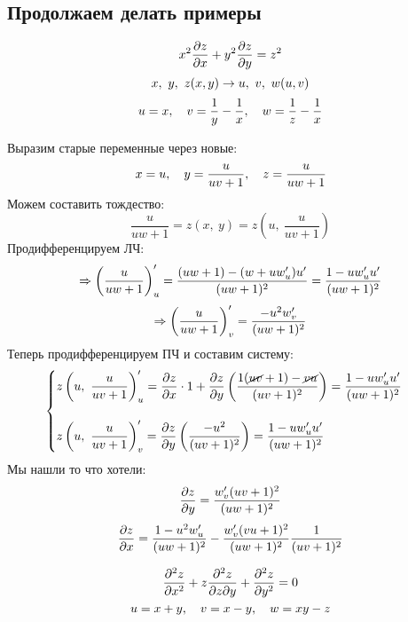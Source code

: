 \documentclass[main]{subfiles}
\begin{document}
    \subsection{Продолжаем делать примеры}

    \begin{Example}[3475]
        \[x^2 \dfrac{\partial z}{\partial x} + y^2 \dfrac{\partial z}{\partial y} = z^2\]
        \[x,\ y,\ z(x,y) \rightarrow u,\ v,\ w(u,v)\]
        \[u = x,\quad v = \dfrac{1}{y}-\dfrac{1}{x},\quad w = \dfrac{1}{z} - \dfrac{1}{x}\]
    \end{Example}

    \begin{sol}
        Выразим старые переменные через новые:
        \[x = u,\quad y = \dfrac{u}{uv + 1},\quad z = \dfrac{u}{uw + 1}\]
        Можем составить тождество:
        \[\dfrac{u}{uw + 1} = z(x,\ y) = z(u,\ \dfrac{u}{uv + 1})\]
        Продифференцируем ЛЧ:
        \[\Rightarrow \left(\dfrac{u}{uw + 1}\right)'_u = \dfrac{(uw + 1) - (w + uw'_u)u'}{(uw+1)^2} = \dfrac{1 - uw'_u u'}{(uw+1)^2}\]
        \[\Rightarrow \left(\dfrac{u}{uw + 1}\right)'_v = \dfrac{-u^2 w'_v}{(uw+1)^2}\]
        Теперь продифференцируем ПЧ и составим систему:
        \[\begin{cases}
            z \left(u,\ \dfrac{u}{uv + 1}\right)'_u = \dfrac{\partial z}{\partial x} \cdot 1 + \dfrac{\partial z}{\partial y} \left(\dfrac{1(\cancel{uv} + 1) - \cancel{vu}}{(uv + 1)^2}\right) = \dfrac{1 - uw'_u u'}{(uw+1)^2}\\ \\
            z \left(u,\ \dfrac{u}{uv + 1}\right)'_v = \dfrac{\partial z}{\partial y} \left(\dfrac{-u^2}{(uv + 1)^2}\right) = \dfrac{1 - uw'_u u'}{(uw+1)^2}
        \end{cases}\]
        Мы нашли то что хотели:
        \[\dfrac{\partial z}{\partial y} = \dfrac{w'_v (uv + 1)^2}{(uw + 1)^2}\]
        \[\dfrac{\partial z}{\partial x} = \dfrac{1-u^2 w'_u}{(uw + 1)^2} - \dfrac{w'_v (vu + 1)^2}{(uw + 1)^2} \dfrac{1}{(uv + 1)^2}\]
    \end{sol}

    \begin{Example}
        \[\dfrac{\partial^2 z}{\partial x^2} + z \dfrac{\partial^2 z}{\partial z \partial y} + \dfrac{\partial^2 z}{\partial y^2} = 0\]
        \[u = x + y,\quad v = x - y,\quad w = xy - z\]
    \end{Example}
\end{document}
